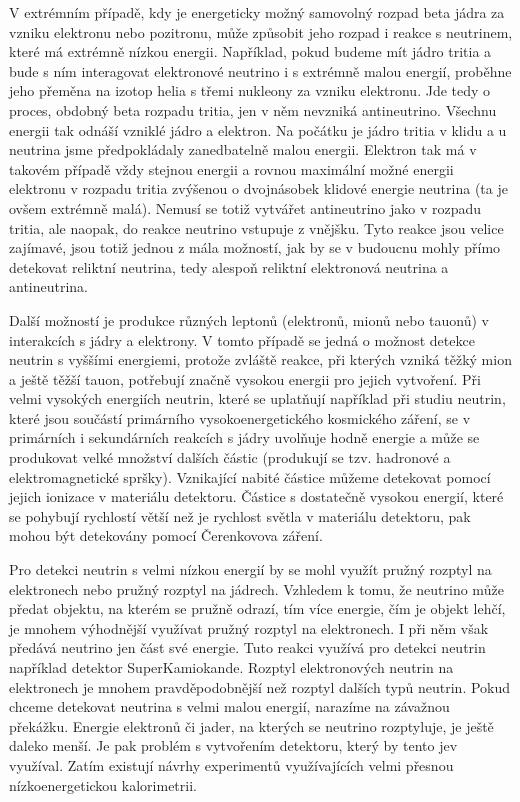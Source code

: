 \documentclass[../../main.tex]{subfiles}
\begin{document}
V extrémním případě, kdy je energeticky možný samovolný rozpad beta jádra za vzniku elektronu nebo pozitronu, může způsobit jeho rozpad i reakce s neutrinem, které má extrémně nízkou energii. Například, pokud budeme mít jádro tritia a bude s ním interagovat elektronové neutrino i s extrémně malou energií, proběhne jeho přeměna na izotop helia s třemi nukleony za vzniku elektronu. Jde tedy o proces, obdobný beta rozpadu tritia, jen v něm nevzniká antineutrino. Všechnu energii tak odnáší vzniklé jádro a elektron. Na počátku je jádro tritia v klidu a u neutrina jsme předpokládaly zanedbatelně malou energii. Elektron tak má v takovém případě vždy stejnou energii a rovnou maximální možné energii elektronu v rozpadu tritia zvýšenou o dvojnásobek klidové energie neutrina (ta je ovšem extrémně malá). Nemusí se totiž vytvářet antineutrino jako v rozpadu tritia, ale naopak, do reakce neutrino vstupuje z vnějšku. Tyto reakce jsou velice zajímavé, jsou totiž jednou z mála možností, jak by se v budoucnu mohly přímo detekovat reliktní neutrina, tedy alespoň reliktní elektronová neutrina a antineutrina.

Další možností je produkce různých leptonů (elektronů, mionů nebo tauonů) v interakcích s jádry a elektrony. V tomto případě se jedná o možnost detekce neutrin s vyššími energiemi, protože zvláště reakce, při kterých vzniká těžký mion a ještě těžší tauon, potřebují značně vysokou energii pro jejich vytvoření. Při velmi vysokých energiích neutrin, které se uplatňují například při studiu neutrin, které jsou součástí primárního vysokoenergetického kosmického záření, se v primárních i sekundárních reakcích s jádry uvolňuje hodně energie a může se produkovat velké množství dalších částic (produkují se tzv. hadronové a elektromagnetické spršky). Vznikající nabité částice můžeme detekovat pomocí jejich ionizace v materiálu detektoru. Částice s dostatečně vysokou energií, které se pohybují rychlostí větší než je rychlost světla v materiálu detektoru, pak mohou být detekovány pomocí Čerenkovova záření.

Pro detekci neutrin s velmi nízkou energií by se mohl využít pružný rozptyl na elektronech nebo pružný rozptyl na jádrech. Vzhledem k tomu, že neutrino může předat objektu, na kterém se pružně odrazí, tím více energie, čím je objekt lehčí, je mnohem výhodnější využívat pružný rozptyl na elektronech. I při něm však předává neutrino jen část své energie. Tuto reakci využívá pro detekci neutrin například detektor SuperKamiokande. Rozptyl elektronových neutrin na elektronech je mnohem pravděpodobnější než rozptyl dalších typů neutrin. Pokud chceme detekovat neutrina s velmi malou energií, narazíme na závažnou překážku. Energie elektronů či jader, na kterých se neutrino rozptyluje, je ještě daleko menší. Je pak problém s vytvořením detektoru, který by tento jev využíval. Zatím existují návrhy experimentů využívajících velmi přesnou nízkoenergetickou kalorimetrii.
\end{document}
